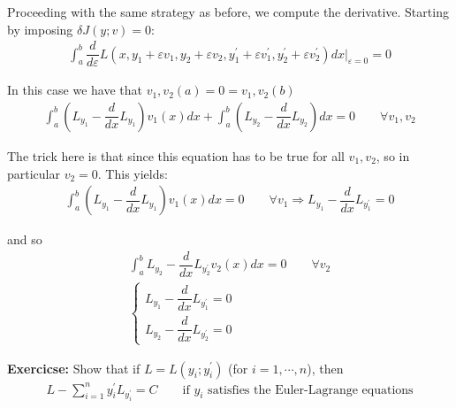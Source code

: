 \par\bigskip
\noindent Proceeding with the same strategy as before, we compute the derivative. Starting by imposing $\delta J(y; v)=0$:
\begin{equation*}
  \begin{gathered}
    \int_{a}^{b}\dfrac{d}{d\varepsilon}L(x,y_1+\varepsilon v_1,y_2+\varepsilon v_2,y_1^{\prime}+\varepsilon v_1^{\prime},y_2^{\prime}+\varepsilon v_2^{\prime})dx|_{\varepsilon=0}=0
  \end{gathered}
\end{equation*}\par
\noindent In this case we have that $ v_1, v_2(a) = 0= v_1, v_2(b)$
\begin{equation*}
  \begin{gathered}
    \int_{a}^{b}\left(L_{y_1}-\dfrac{d}{dx}L_{y_1}\right) v_1(x)dx+\int_{a}^{b}\left(L_{y_2}-\dfrac{d}{dx}L_{y_2}\right)dx=0\qquad\forall v_1,v_2
  \end{gathered}
\end{equation*}
\par\bigskip
\noindent The trick here is that since this equation has to be true for all $v_1, v_2$, so in particular $v_2=0$. This yields:
\begin{equation*}
  \begin{gathered}
    \int_{a}^{b}\left(L_{y_1}-\dfrac{d}{dx}L_{y_1}\right)v_1(x) dx = 0\qquad\forall v_1\Rightarrow L_{y_1}-\dfrac{d}{dx}L_{y_1^{\prime}}= 0
  \end{gathered}
\end{equation*}
\par\bigskip
\noindent and so 
\begin{equation*}
  \begin{gathered}
    \int_{a}^{b}L_{y_2}-\dfrac{d}{dx}L_{y_2^{\prime}}v_2(x)dx = 0\qquad\forall v_2\\
    \begin{cases*}
      L_{y_1} -\dfrac{d}{dx}L_{y_1^{\prime}} = 0\\
      L_{y_2} -\dfrac{d}{dx}L_{y_2^{\prime}} = 0
    \end{cases*}
  \end{gathered}
\end{equation*}
\par\bigskip
\noindent\textbf{Exercicse:} Show that if $L = L(y_i; y_i^{\prime})$ (for $i=1,\cdots, n$), then
\begin{equation*}
  \begin{gathered}
    L-\sum_{i=1}^{n}y_i^{\prime}L_{y_i^{\prime}} = C\qquad\text{if } y_i\text{ satisfies the Euler-Lagrange equations}
  \end{gathered}
\end{equation*}
